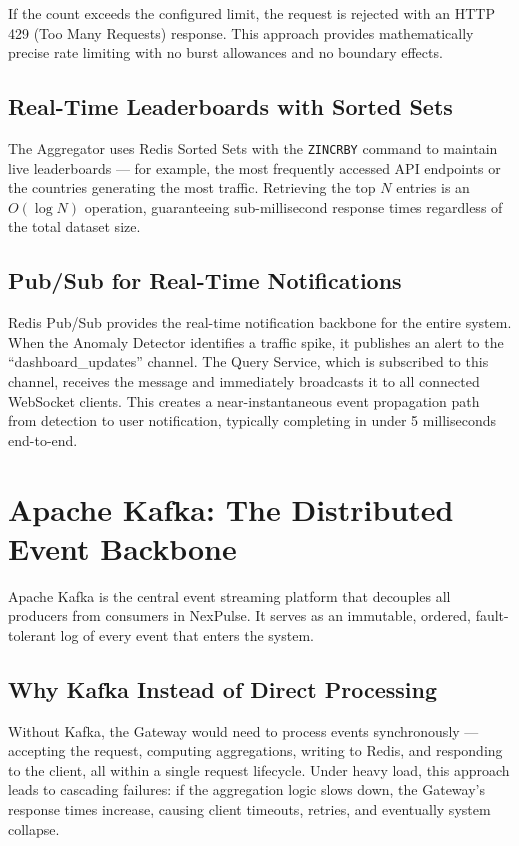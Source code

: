 \documentclass[12pt,a4paper]{article}
\begin{document}
If the count exceeds the configured limit, the request is rejected with an HTTP 429 (Too Many Requests) response. This approach provides mathematically precise rate limiting with no burst allowances and no boundary effects.

\subsection{Real-Time Leaderboards with Sorted Sets}

The Aggregator uses Redis Sorted Sets with the \texttt{ZINCRBY} command to maintain live leaderboards --- for example, the most frequently accessed API endpoints or the countries generating the most traffic. Retrieving the top $N$ entries is an $O(\log N)$ operation, guaranteeing sub-millisecond response times regardless of the total dataset size.

\subsection{Pub/Sub for Real-Time Notifications}

Redis Pub/Sub provides the real-time notification backbone for the entire system. When the Anomaly Detector identifies a traffic spike, it publishes an alert to the ``dashboard\_updates'' channel. The Query Service, which is subscribed to this channel, receives the message and immediately broadcasts it to all connected WebSocket clients. This creates a near-instantaneous event propagation path from detection to user notification, typically completing in under 5 milliseconds end-to-end.

\section{Apache Kafka: The Distributed Event Backbone}

Apache Kafka is the central event streaming platform that decouples all producers from consumers in NexPulse. It serves as an immutable, ordered, fault-tolerant log of every event that enters the system.

\subsection{Why Kafka Instead of Direct Processing}

Without Kafka, the Gateway would need to process events synchronously --- accepting the request, computing aggregations, writing to Redis, and responding to the client, all within a single request lifecycle. Under heavy load, this approach leads to cascading failures: if the aggregation logic slows down, the Gateway's response times increase, causing client timeouts, retries, and eventually system collapse.
\end{document}
